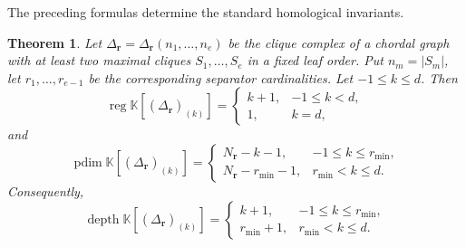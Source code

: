 \documentclass[11pt]{amsart}
\newtheorem{theorem}{Theorem}[section]
\theoremstyle{definition}
\theoremstyle{remark}
\newcommand{\K}{\mathbb K}
\newcommand{\SR}[1]{\K[#1]}
\DeclareMathOperator{\pdim}{pdim}
\DeclareMathOperator{\reg}{reg}
\begin{document}
	The preceding formulas determine the standard homological invariants.
	
	\begin{theorem}\label{thm:2}
		Let $\Delta_{\mathbf r}=\Delta_{\mathbf r}(n_1,\ldots,n_e)$ be the clique complex of a chordal graph with at least two maximal cliques $S_1,\ldots,S_e$ in a fixed leaf order. Put $n_m=|S_m|$, let $r_1,\ldots,r_{e-1}$ be the corresponding separator cardinalities.
		Let $-1\le k\le d$. Then
		\[
		\reg\SR{(\Delta_{\mathbf r})_{(k)}}
		=
		\begin{cases}
			k+1,&-1\le k<d,\\
			1,&k=d,
		\end{cases}
		\]
		and
		\[
		\pdim\SR{(\Delta_{\mathbf r})_{(k)}}
		=
		\begin{cases}
			N_{\mathbf r}-k-1,&-1\le k\le r_{\min},\\
			N_{\mathbf r}-r_{\min}-1,&r_{\min}<k\le d.
		\end{cases}
		\]
		Consequently,
		\[
		\operatorname{depth}\SR{(\Delta_{\mathbf r})_{(k)}}
		=
		\begin{cases}
			k+1,&-1\le k\le r_{\min},\\
			r_{\min}+1,&r_{\min}<k\le d.
		\end{cases}
		\]
	\end{theorem}
	
\end{document}
